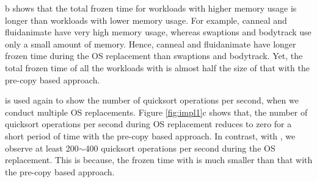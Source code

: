 b shows that the total frozen time for workloads with higher memory usage is longer than workloads with lower memory usage. For example, canneal and fluidanimate have very high memory usage, whereas swaptions and bodytrack use only a small amount of memory. Hence, canneal and fluidanimate have longer frozen time during the OS replacement than swaptions and bodytrack. Yet, the total frozen time of all the workloads with \arch is almost half the size of that with the pre-copy based approach.

 is used again to show the number of quicksort operations per second, when we conduct multiple OS replacements. Figure \ref{fig:impl1}c shows that, the number of quicksort operations per second during OS replacement reduces to zero for a short period of time with the pre-copy based approach. In contrast, with \arch, we observe at least 200$\sim$400 quicksort operations per second during the OS replacement. This is because, the frozen time with \arch is much smaller than that with the pre-copy based approach.

%	
	

